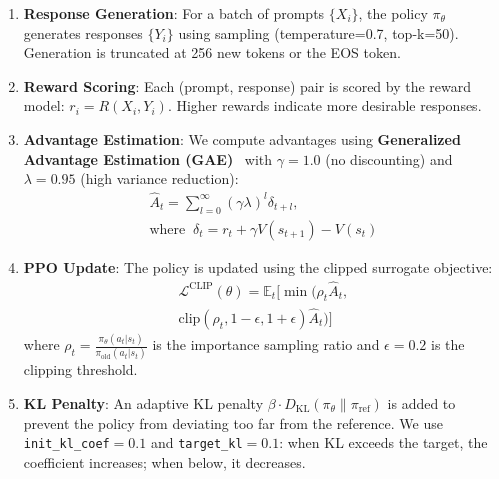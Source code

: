 \begin{enumerate}[leftmargin=*]
    \item \textbf{Response Generation}: For a batch of prompts $\{X_i\}$, the policy $\pi_\theta$ generates responses $\{Y_i\}$ using sampling (temperature=0.7, top-k=50). Generation is truncated at 256 new tokens or the EOS token.

    \item \textbf{Reward Scoring}: Each (prompt, response) pair is scored by the reward model: $r_i = R(X_i, Y_i)$. Higher rewards indicate more desirable responses.

    \item \textbf{Advantage Estimation}: We compute advantages using \textbf{Generalized Advantage Estimation (GAE)}~\cite{schulman2015high} with $\gamma=1.0$ (no discounting) and $\lambda=0.95$ (high variance reduction):
    {\small
    \begin{gather*}
        \hat{A}_t = \sum_{l=0}^{\infty} (\gamma \lambda)^l \delta_{t+l},\\
        \text{where}\;\; \delta_t = r_t + \gamma V(s_{t+1}) - V(s_t)
    \end{gather*}
    }

    \item \textbf{PPO Update}: The policy is updated using the clipped surrogate objective:
    {\small
    \begin{multline*}
        \mathcal{L}^{\text{CLIP}}(\theta) = \mathbb{E}_t \Big[ \min\big( \rho_t \hat{A}_t,\\
        \text{clip}(\rho_t, 1{-}\epsilon, 1{+}\epsilon) \hat{A}_t \big) \Big]
    \end{multline*}
    }
    where $\rho_t = \frac{\pi_\theta(a_t|s_t)}{\pi_{\text{old}}(a_t|s_t)}$ is the importance sampling ratio and $\epsilon=0.2$ is the clipping threshold.

    \item \textbf{KL Penalty}: An adaptive KL penalty $\beta \cdot D_{\text{KL}}(\pi_\theta \| \pi_{\text{ref}})$ is added to prevent the policy from deviating too far from the reference. We use \texttt{init\_kl\_coef}$=0.1$ and \texttt{target\_kl}$=0.1$: when KL exceeds the target, the coefficient increases; when below, it decreases.
\end{enumerate}

